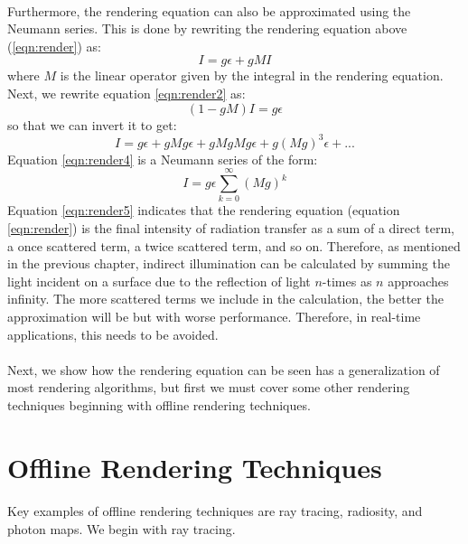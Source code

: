 \paragraph{}
Furthermore, the rendering equation can also be approximated using the Neumann series.  This is done by rewriting the rendering equation above (\ref{eqn:render}) as:
\begin{equation}
I = g\epsilon +gMI \label{eqn:render2}
\end{equation}
where $M$ is the linear operator given by the integral in the rendering equation.  Next, we rewrite equation \ref{eqn:render2} as:
\begin{equation}
(1-gM)I = g\epsilon \label{eqn:render3}
\end{equation}
so that we can invert it to get:
\begin{equation}
I = g\epsilon + gMg\epsilon + gMgMg\epsilon +g(Mg)^3\epsilon + ... \label{eqn:render4}
\end{equation}
Equation \ref{eqn:render4} is a Neumann series of the form:
\begin{equation}
I = g\epsilon\sum_{k=0}^{\infty}(Mg)^k \label{eqn:render5}
\end{equation}
Equation \ref{eqn:render5} indicates that the rendering equation (equation \ref{eqn:render}) is the final intensity of radiation transfer as a sum of a direct term, a once scattered term, a twice scattered term, and so on.  Therefore, as mentioned in the previous chapter, indirect illumination can be calculated by summing the light incident on a surface due to the reflection of light $n$-times as $n$ approaches infinity.  The more scattered terms we include in the calculation, the better the approximation will be but with worse performance.  Therefore, in real-time applications, this needs to be avoided.  

\paragraph{}
Next, we show how the rendering equation can be seen has a generalization of most rendering algorithms, but first we must cover some other rendering techniques beginning with offline rendering techniques.

\section{Offline Rendering Techniques}
\paragraph{}
Key examples of offline rendering techniques are ray tracing, radiosity, and photon maps.  We begin with ray tracing.

